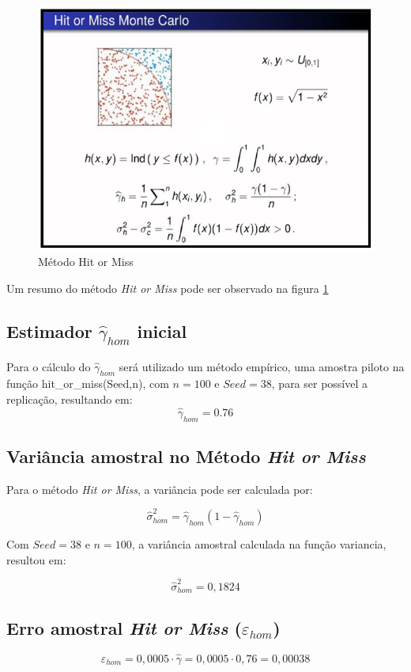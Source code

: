 \documentclass{article}
\begin{document}
\begin{figure}[H]
    \centering
    \includegraphics[width=.7\linewidth]{Imagens/MC_HoM.png}
    \caption{Método Hit or Miss}
    \label{fig:HoM}
\end{figure}

Um resumo do método \textit{Hit or Miss} pode ser observado na figura \ref{fig:HoM} 


\subsection{Estimador $\hat{\gamma}_{hom}$ inicial}
Para o cálculo do $\hat{\gamma}_{hom}$ será utilizado um método empírico, uma amostra piloto na função hit\_or\_miss(Seed,n), com $n=100$ e $Seed=38$, para ser possível a replicação, resultando em:
\[
    \hat{\gamma}_{hom} = 0.76
\]

\subsection{Variância amostral no Método \textit{Hit or Miss}}

Para o método \textit{Hit or Miss}, a variância pode ser calculada por:

\begin{equation*}
    \hat{\sigma}_{hom}^2 = \hat{\gamma}_{hom}(1-\hat{\gamma}_{hom})
\end{equation*}

Com $Seed=38$ e $n=100$, a variância amostral calculada na função variancia, resultou em:

\[
    \hat{\sigma}_{hom}^2 = 0,1824
\]
\subsection{Erro amostral \textit{Hit or Miss} ($\varepsilon_{hom}$)}

\begin{equation*}
    \varepsilon_{hom} = 0,0005\cdot\hat{\gamma} = 0,0005\cdot0,76 = 0,00038
\end{equation*}
\end{document}
